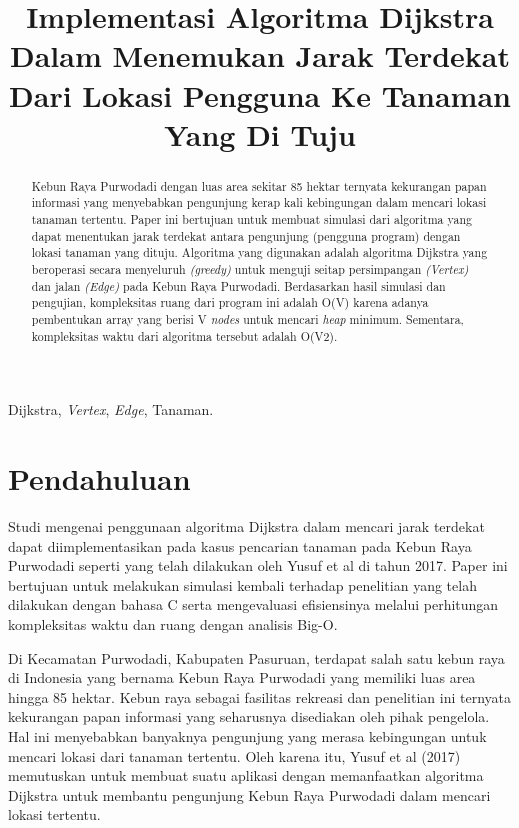 \documentclass[conference]{IEEEtran}
\title{Implementasi Algoritma Dijkstra Dalam Menemukan Jarak Terdekat Dari Lokasi Pengguna Ke Tanaman Yang Di Tuju}
\author{\IEEEauthorblockN{Michelle Angelina}
\IEEEauthorblockA{\textit{School of Electrical Engineering and Informatics} \\
\textit{Institut Teknologi Bandung} \\
Bandung, Indonesia\\
Email: 18320007@std.stei.itb.ac.id}
}
\begin{document}
\maketitle

	\begin{abstract}
		Kebun Raya Purwodadi dengan luas area sekitar 85
hektar ternyata kekurangan papan informasi yang menyebabkan
pengunjung kerap kali kebingungan dalam mencari lokasi tanaman tertentu. Paper ini bertujuan untuk membuat simulasi
dari algoritma yang dapat menentukan jarak terdekat antara
pengunjung (pengguna program) dengan lokasi tanaman yang
dituju. Algoritma yang digunakan adalah algoritma Dijkstra
yang beroperasi secara menyeluruh \textit{(greedy)} untuk menguji
seitap persimpangan \textit{(Vertex)} dan jalan \textit{(Edge)} pada Kebun
Raya Purwodadi. Berdasarkan hasil simulasi dan pengujian,
kompleksitas ruang dari program ini adalah O(V) karena adanya
pembentukan array yang berisi V \textit{nodes} untuk mencari \textit{heap} minimum. Sementara, kompleksitas waktu dari algoritma tersebut
adalah O(V2).
	\end{abstract}

	\begin{IEEEkeywords}
		Dijkstra, \textit{Vertex}, \textit{Edge}, Tanaman.
	\end{IEEEkeywords} 

	\section{Pendahuluan}
	Studi mengenai penggunaan algoritma Dijkstra dalam mencari jarak terdekat dapat diimplementasikan pada kasus pencarian tanaman pada Kebun Raya Purwodadi seperti yang telah
dilakukan oleh Yusuf et al di tahun 2017\cite{implementasi}. Paper ini bertujuan untuk melakukan simulasi kembali terhadap penelitian
yang telah dilakukan dengan bahasa C serta mengevaluasi
efisiensinya melalui perhitungan kompleksitas waktu dan ruang dengan analisis Big-O.

Di Kecamatan Purwodadi, Kabupaten Pasuruan, terdapat
salah satu kebun raya di Indonesia yang bernama Kebun
Raya Purwodadi yang memiliki luas area hingga 85 hektar.
Kebun raya sebagai fasilitas rekreasi dan penelitian ini ternyata
kekurangan papan informasi yang seharusnya disediakan oleh
pihak pengelola. Hal ini menyebabkan banyaknya pengunjung
yang merasa kebingungan untuk mencari lokasi dari tanaman
tertentu. Oleh karena itu, Yusuf et al (2017) memutuskan
untuk membuat suatu aplikasi dengan memanfaatkan algoritma
Dijkstra untuk membantu pengunjung Kebun Raya Purwodadi
dalam mencari lokasi tertentu.
\end{document}
